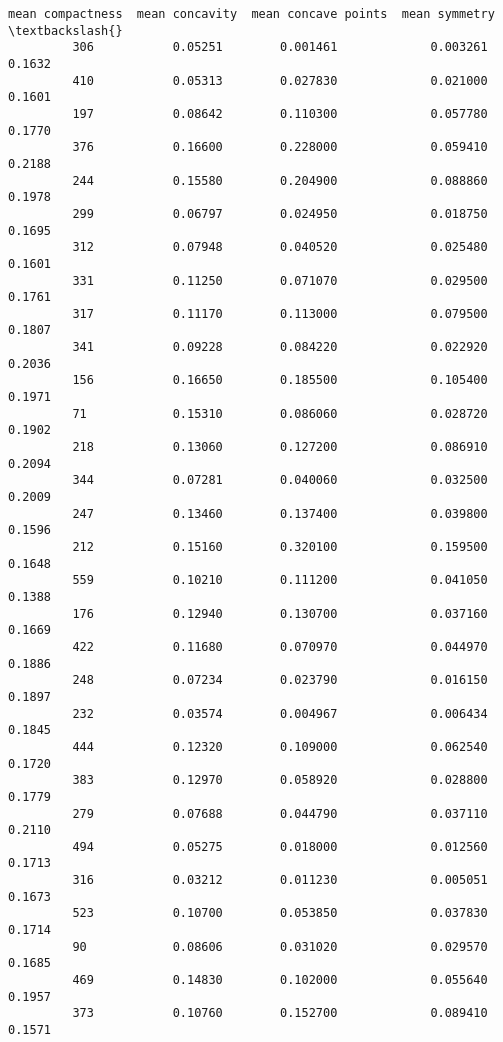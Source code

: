 \documentclass[11pt]{article}
\begin{document}
\begin{Verbatim}[commandchars=\\\{\}]
              mean compactness  mean concavity  mean concave points  mean symmetry  \textbackslash{}
         306           0.05251        0.001461             0.003261         0.1632   
         410           0.05313        0.027830             0.021000         0.1601   
         197           0.08642        0.110300             0.057780         0.1770   
         376           0.16600        0.228000             0.059410         0.2188   
         244           0.15580        0.204900             0.088860         0.1978   
         299           0.06797        0.024950             0.018750         0.1695   
         312           0.07948        0.040520             0.025480         0.1601   
         331           0.11250        0.071070             0.029500         0.1761   
         317           0.11170        0.113000             0.079500         0.1807   
         341           0.09228        0.084220             0.022920         0.2036   
         156           0.16650        0.185500             0.105400         0.1971   
         71            0.15310        0.086060             0.028720         0.1902   
         218           0.13060        0.127200             0.086910         0.2094   
         344           0.07281        0.040060             0.032500         0.2009   
         247           0.13460        0.137400             0.039800         0.1596   
         212           0.15160        0.320100             0.159500         0.1648   
         559           0.10210        0.111200             0.041050         0.1388   
         176           0.12940        0.130700             0.037160         0.1669   
         422           0.11680        0.070970             0.044970         0.1886   
         248           0.07234        0.023790             0.016150         0.1897   
         232           0.03574        0.004967             0.006434         0.1845   
         444           0.12320        0.109000             0.062540         0.1720   
         383           0.12970        0.058920             0.028800         0.1779   
         279           0.07688        0.044790             0.037110         0.2110   
         494           0.05275        0.018000             0.012560         0.1713   
         316           0.03212        0.011230             0.005051         0.1673   
         523           0.10700        0.053850             0.037830         0.1714   
         90            0.08606        0.031020             0.029570         0.1685   
         469           0.14830        0.102000             0.055640         0.1957   
         373           0.10760        0.152700             0.089410         0.1571   

\end{Verbatim}
\end{document}
